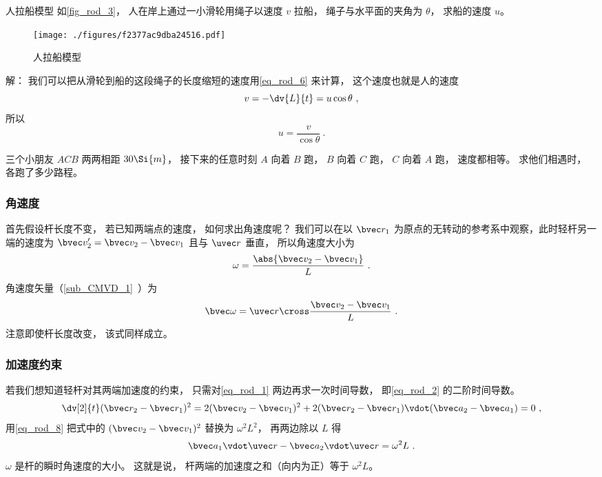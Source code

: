 \begin{example}{人拉船模型}\label{ex_rod_2}
如\autoref{fig_rod_3}， 人在岸上通过一小滑轮用绳子以速度 $v$ 拉船， 绳子与水平面的夹角为 $\theta$， 求船的速度 $u$。
\begin{figure}[ht]
\centering
\texttt{[image: ./figures/f2377ac9dba24516.pdf]}
\caption{人拉船模型} \label{fig_rod_3}
\end{figure}

解： 我们可以把从滑轮到船的这段绳子的长度缩短的速度用\autoref{eq_rod_6} 来计算， 这个速度也就是人的速度
\begin{equation}
v = -\dv{L}{t} = u \cos\theta~,
\end{equation}
所以
\begin{equation}
u = \frac{v}{\cos\theta}~.
\end{equation}
\end{example}

\begin{exercise}{}
三个小朋友 $ACB$ 两两相距 $30\Si{m}$， 接下来的任意时刻 $A$ 向着 $B$ 跑， $B$ 向着 $C$ 跑， $C$ 向着 $A$ 跑， 速度都相等。 求他们相遇时， 各跑了多少路程。
\end{exercise}

\subsubsection{角速度}

首先假设杆长度不变， 若已知两端点的速度， 如何求出角速度呢？ 我们可以在以 $\bvec r_1$ 为原点的无转动的参考系中观察，此时轻杆另一端的速度为 $\bvec v_2' = \bvec v_2 - \bvec v_1$ 且与 $\uvec r$ 垂直， 所以角速度大小为
\begin{equation}\label{eq_rod_8}
\omega = \frac{\abs{\bvec v_2 - \bvec v_1}}{L}~.
\end{equation}
角速度矢量（\autoref{sub_CMVD_1}~）为
\begin{equation}\label{eq_rod_4}
\bvec \omega = \uvec r \cross \frac{\bvec v_2 - \bvec v_1}{L}~.
\end{equation}
注意即使杆长度改变， 该式同样成立。

\subsubsection{加速度约束}
若我们想知道轻杆对其两端加速度的约束， 只需对\autoref{eq_rod_1} 两边再求一次时间导数， 即\autoref{eq_rod_2} 的二阶时间导数。
\begin{equation}
\dv[2]{t} (\bvec r_2 - \bvec r_1)^2 = 2(\bvec v_2 - \bvec v_1)^2 + 2(\bvec r_2 - \bvec r_1) \vdot (\bvec a_2 - \bvec a_1) = 0~,
\end{equation}
用\autoref{eq_rod_8} 把式中的 $(\bvec v_2 - \bvec v_1)^2$ 替换为 $\omega^2 L^2$， 再两边除以 $L$ 得
\begin{equation}\label{eq_rod_5}
\bvec a_1 \vdot \uvec r - \bvec a_2 \vdot \uvec r  = \omega^2 L~.
\end{equation}
$\omega$ 是杆的瞬时角速度的大小。 这就是说， 杆两端的加速度之和（向内为正）等于 $\omega^2L$。

